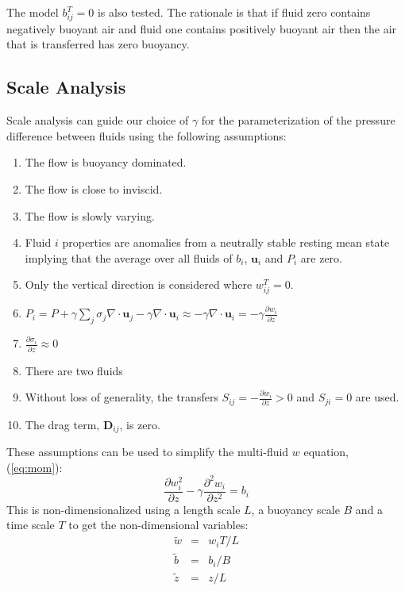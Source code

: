 \documentclass[draft]{agujournal2019}
\begin{document}
The model $b_{ij}^T=0$ is also tested. The rationale is that if fluid zero contains negatively buoyant air and fluid one contains positively buoyant air then the air that is transferred has zero buoyancy.

\subsection{\label{subsec:dimAnal}Scale
 Analysis}

Scale analysis can guide our choice of $\gamma$ for the parameterization of the pressure difference between fluids using the following assumptions:
\begin{enumerate}
\item The flow is buoyancy dominated.
\item The flow is close to inviscid.
\item The flow is slowly varying.
\item Fluid $i$ properties are anomalies from a neutrally stable resting
mean state 
implying that the average over all fluids of $b_i$, $\mathbf{u}_i$ and $P_i$ are zero.
\item Only the vertical direction is considered where $w_{ij}^{T}=0$.
\item $P_{i} = P + \gamma\sum_j \sigma_j\nabla\cdot\mathbf{u}_j 
                              - \gamma\nabla\cdot\mathbf{u}_{i}
             \approx-\gamma\nabla\cdot\mathbf{u}_{i}
            =-\gamma\frac{\partial w_{i}}{\partial z}$
\item $\frac{\partial \sigma_i}{\partial z} \approx 0$
\item There are two fluids 
\item Without loss of generality, the transfers $S_{ij}=-\frac{\partial w_{i}}{\partial z}>0$
and $S_{ji}=0$ are used.
\item The drag term, $\mathbf{D}_{ij}$, is zero.
\end{enumerate}
These assumptions can be used to simplify the multi-fluid $w$ equation, ({\protect\ref{eq:mom})}:
\begin{equation}
\frac{\partial w_{i}^{2}}{\partial z}-\gamma\frac{\partial^{2}w_{i}}{\partial z^{2}}=b_{i}\label{eq:wi_balances}
\end{equation}
This is non-dimensionalized using a length scale $L$, a buoyancy scale
$B$ and a time scale $T$ to get the non-dimensional variables:
\begin{eqnarray*}
\tilde{w} & = & w_{i}T/L\\
\tilde{b} & = & b_{i}/B\\
\tilde{z} & = & z/L
\end{eqnarray*}
\end{document}
